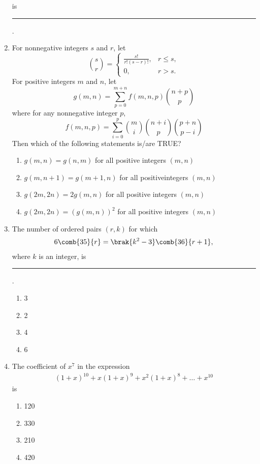 \begin{enumerate}[label=\thesubsection.\arabic*,ref=\thesubsection.\theenumi]
	is \rule{1cm}{0.1pt}.
\hfill {}
\item For nonnegative integers $s$ and $r$, let 
$$\binom{s}{r} =
\begin{cases}
\frac{s!}{r!(s - r)!},& r \leq s,\\ 0, &  r > s.
\end{cases}$$
For positive integers $m$ and $n$, let 
	  $$g(m, n) = \sum_{p=0}^{m+n} f(m, n, p) \binom{n + p}{p}$$
where for any nonnegative integer $p$,
       $$ f(m, n, p) = \sum_{i=0}^{p} \binom{m}{i} \binom{n + i}{p} \binom{p + n}{p - i}$$
Then which of the following statements is/are TRUE?
\hfill {}
\begin{enumerate}
\item $ g(m, n) = g(n, m) $ for all positive integers $( m, n )$
\item $ g(m, n + 1) = g(m + 1, n) $ for all positiveintegers $( m, n )$  
\item $ g(2m, 2n) = 2 g(m, n) $ for all positive integers $( m, n )$  
\item $ g(2m, 2n) = (g(m, n))^2 $ for all positive integers $( m, n )$
\end{enumerate}
\item The number of ordered pairs $(r, k)$ for which \begin{align*}6\comb{35}{r} = \brak{k^2 - 3}\comb{36}{r+1}, \end{align*}where $k$ is an integer, is
\rule{1cm}{0.1pt}.
\hfill {}
\begin{multicols}{4}
\begin{enumerate}
   \item 3
   \item 2
   \item 4
   \item 6
\end{enumerate}
\end{multicols}
\item The coefficient of $x^7$ in the expression\begin{align*}(1 + x)^{10} + x (1 + x)^9 + x^2 (1 + x)^8 + \dots + x^{10} \end{align*}is
\hfill{}
\begin{multicols}{4}
\begin{enumerate}  
   \item  120
   \item  330
   \item  210
   \item  420
\end{enumerate}
\end{multicols}
\end{enumerate}


